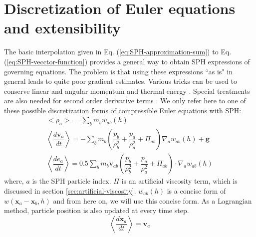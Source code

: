 \section{Discretization of Euler equations and extensibility}
The basic interpolation given in Eq. (\ref{eq:SPH-approximation-sum}) to Eq. (\ref{eq:SPH-vecctor-function}) provides a general way to obtain SPH expressions of governing equations. The problem is that using these expressions ``{as is}" in general leads to quite poor gradient estimates. Various tricks can be used to conserve linear and angular momentum and thermal energy \citep{monaghan1992smoothed}. Special treatments are also needed for second order derivative terms \citep{monaghan2005smoothed}. We only refer here to one of these possible discretization forms of compressible Euler equations with SPH:
\begin{align}
<\rho_a> = \sum_b m_b w_{ab} \left(h\right) \label{eq:ns-sph-d} \\
\left\langle\dfrac{d \textbf{v}_a}{d t}\right\rangle = -\sum_b m_b \left(\dfrac{p_b}{\rho_b^2} + \dfrac{p_a}{\rho_a^2} + \Pi_{ab}\right) \nabla_a w_{a b}\left(h\right) +\textbf{g} \label{eq:ns-sph-v} \\
\left\langle\dfrac{d e_a}{d t}\right\rangle=
 0.5\sum_b m_b \textbf{v}_{a b}\left(\dfrac{p_b}{\rho_b^2} + \dfrac{p_a}{\rho_a^2} + \Pi_{ab}\right) \cdot \nabla_a w_{a b}\left(h\right) \label{eq:ns-sph-e}
\end{align}
where, $a$ is the SPH particle index. $\Pi$ is an artificial viscosity term, which is discussed in section \ref{sec:artificial-viscosity}. $w_{a b}\left(h\right)$ is a concise form of $w\left(\textbf{x}_a - \textbf{x}_b, h\right)$ and from here on, we will use this concise form.
As a Lagrangian method, particle position is also updated at every time step.
\begin{equation}
\left\langle\dfrac{d \textbf{x}_a}{dt}\right\rangle = \textbf{v}_a \label{eq:SPH-update-pos}
\end{equation}

